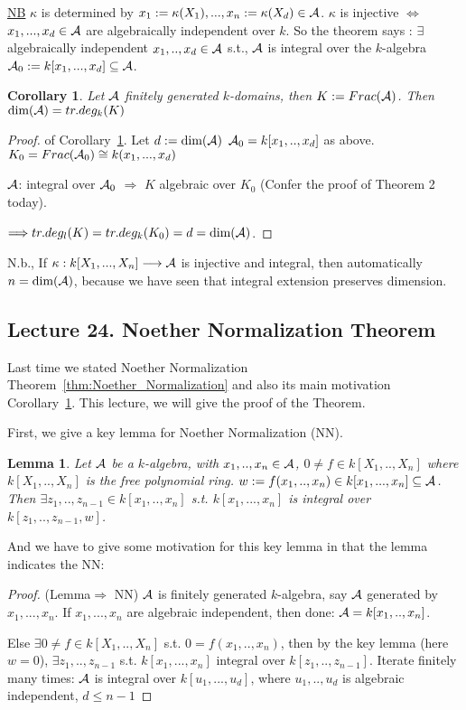 \documentclass[11pt]{article}
\newtheorem{lemma}[thm]{Lemma}
\newtheorem{cor}[thm]{Corollary}
\newcommand{\cala}{{\cal A}}
\newcommand{\Lrta}{\Longrightarrow}
\newcommand{\lrta}{\longrightarrow}
\newcommand{\Llrta}{\Longleftrightarrow}
\begin{document}
\underline{NB} $\kappa$ is determined by $x_1:=\kappa(X_1),...,x_n:=\kappa(X_d)\in\cala$. $\kappa $ is injective $\Llrta$ $x_1,...,x_d\in \cala$ are algebraically independent over $k$.  So the theorem says : $\exists$ algebraically independent $x_1,..,x_d\in \cala$ s.t., $\cala$ is integral over the $k$-algebra $\cala_0:=k[x_1,...,x_d]\subseteq \cala$.
\begin{cor}\label{cor:k-domain_dim_tr.deg}
Let $\cala$ finitely generated $k$-domains, then $K:=Frac(\cala)$. Then $\text{dim}(\cala)=tr.deg_k(K)$
\end{cor}
\begin{proof} of Corollary~\ref{cor:k-domain_dim_tr.deg}. Let $d:=\text{dim}(\cala)$ $\cala_0=k[x_1,..,x_d]$ as above. 
$K_0=Frac(\cala_0)\cong k(x_1,...,x_d)$

$\cala$: integral over $\cala_0$ $\Lrta$ $K$ algebraic over $K_0$ (Confer the proof of Theorem 2 today).

$\Lrta tr.deg_l(K)=tr.deg_k(K_0)=d=\text{dim}(\cala)$.
\end{proof}
N.b., If $\kappa: k[X_1,...,X_n]\lrta\cala$ is injective and integral, then automatically $n=\text{dim}(\cala)$, because we have seen that integral extension preserves dimension.


\subsection{Lecture 24. Noether Normalization Theorem}
Last time we stated Noether Normalization Theorem~\ref{thm:Noether_Normalization} and also its main motivation Corollary~\ref{cor:k-domain_dim_tr.deg}. This lecture, we will give the proof of the Theorem.

First, we give a key lemma for Noether Normalization (NN).
\begin{lemma}\label{lem:key_lemma_noether_normalization}
Let $\cala$ be a $k$-algebra, with $x_1,..,x_n\in \cala$, $0\neq f\in k[X_1,..,X_n]$ where $k[X_1,..,X_n]$ is the free polynomial ring. $w:=f(x_1,..,x_n)\in k[x_1,...,x_n]\subseteq \cala$. Then $\exists z_1,..,z_{n-1}\in k[x_1,..,x_n]$ s.t. $k[x_1,...,x_n]$ is integral over $k[z_1,..,z_{n-1},w]$.
\end{lemma}

And we have to give some motivation for this key lemma in that the lemma indicates the NN:
\begin{proof}(Lemma$\Lrta$ NN) $\cala$ is finitely generated $k$-algebra, say $\cala$ generated by $x_1,...,x_n$. If $x_1,...,x_n$ are algebraic independent, then done: $\cala=k[x_1,..,x_n]$. 

Else $\exists 0\neq f\in k[X_1,..,X_n]$ s.t. $0=f(x_1,..,x_n)$, then by the key lemma (here $w=0$), $\exists z_1,..,z_{n-1}$ s.t. $k[x_1,...,x_n]$ integral over $k[z_1,..,z_{n-1}]$. Iterate finitely many times: $\cala$ is integral over $k[u_1,...,u_d]$, where $u_1,..,u_d$ is algebraic independent, $d\leq n-1$ 
\end{proof}
\end{document}
